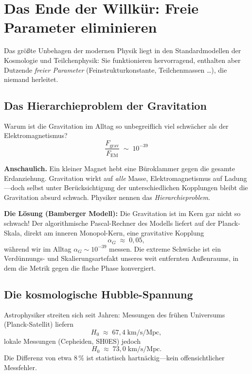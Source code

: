 \documentclass[11pt,a4paper]{article}
\begin{document}
\section{Das Ende der Willk\"ur: Freie Parameter eliminieren}

Das größte Unbehagen der modernen Physik liegt in den Standardmodellen der Kosmologie und Teilchenphysik: Sie funktionieren hervorragend, enthalten aber Dutzende \emph{freier Parameter} (Feinstrukturkonstante, Teilchenmassen \ldots), die niemand herleitet.

\subsection{Das Hierarchieproblem der Gravitation}

Warum ist die Gravitation im Alltag so unbegreiflich viel schwächer als der Elektromagnetismus?
\begin{equation}
  \frac{F_{\text{grav}}}{F_{\text{EM}}} \;\sim\; 10^{-39}
  \label{eq:hierarchy}
\end{equation}

\medskip
\noindent\textbf{Anschaulich.} Ein kleiner Magnet hebt eine Büroklammer gegen die gesamte Erdanziehung. Gravitation wirkt auf \emph{alle} Masse, Elektromagnetismus auf Ladung---doch selbst unter Berücksichtigung der unterschiedlichen Kopplungen bleibt die Gravitation absurd schwach. Physiker nennen das \emph{Hierarchieproblem}.

\textbf{Die Lösung (Bamberger Modell):} Die Gravitation ist im Kern gar nicht so schwach! Der algorithmische Pascal-Rechner des Modells liefert auf der Planck-Skala, direkt am inneren Monopol-Kern, eine gravitative Kopplung
\begin{equation}
  \alpha_G \;\approx\; 0{,}05,
\end{equation}
während wir im Alltag $\alpha_G \sim 10^{-39}$ messen. Die extreme Schwäche ist ein Verdünnungs- und Skalierungsartefakt unseres weit entfernten Außenraums, in dem die Metrik gegen die flache Phase konvergiert.

\subsection{Die kosmologische Hubble-Spannung}

Astrophysiker streiten sich seit Jahren: Messungen des frühen Universums (Planck-Satellit) liefern
\[
  H_0 \;\approx\; 67{,}4\;\mathrm{km/s/Mpc},
\]
lokale Messungen (Cepheiden, SH0ES) jedoch
\[
  H_0 \;\approx\; 73{,}0\;\mathrm{km/s/Mpc}.
\]
Die Differenz von etwa $8\,\%$ ist statistisch hartnäckig---kein offensichtlicher Messfehler.
\end{document}
